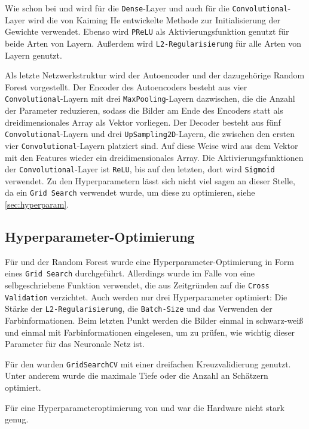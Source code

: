 Wie schon bei \PreDog{} und \PreBig{} wird für die \texttt{Dense}-Layer und auch
für die \texttt{Convolutional}-Layer wird die von Kaiming He entwickelte Methode
zur Initialisierung der Gewichte verwendet. Ebenso wird \texttt{PReLU} als
Aktivierungsfunktion genutzt für beide Arten von Layern. Außerdem wird
\texttt{L2-Regularisierung} für alle Arten von Layern genutzt.

Als letzte Netzwerkstruktur wird der Autoencoder und der dazugehörige Random
Forest vorgestellt. Der Encoder des Autoencoders besteht aus vier
\texttt{Convolutional}-Layern mit drei \texttt{MaxPooling}-Layern dazwischen,
die die Anzahl der Parameter reduzieren, sodass die Bilder am Ende des Encoders
statt als dreidimensionales Array als Vektor vorliegen. Der Decoder besteht aus
fünf \texttt{Convolutional}-Layern und drei \texttt{UpSampling2D}-Layern, die
zwischen den ersten vier \texttt{Convolutional}-Layern platziert sind. Auf diese
Weise wird aus dem Vektor mit den Features wieder ein dreidimensionales Array.
Die Aktivierungsfunktionen der \texttt{Convolutional}-Layer ist \texttt{ReLU},
bis auf den letzten, dort wird \texttt{Sigmoid} verwendet. Zu den
Hyperparametern lässt sich nicht viel sagen an dieser Stelle, da ein
\texttt{Grid Search} verwendet wurde, um diese zu optimieren, siehe
\autoref{sec:hyperparam}.

\subsection{Hyperparameter-Optimierung}
\label{sec:hyperparam}
Für \MiniDog{} und der Random Forest wurde eine Hyperparameter-Optimierung in Form
eines \texttt{Grid Search} durchgeführt. Allerdings wurde im Falle von \MiniDog{}
eine selbgeschriebene Funktion verwendet, die aus Zeitgründen auf die
\texttt{Cross Validation} verzichtet. Auch werden nur drei Hyperparameter
optimiert: Die Stärke der \texttt{L2-Re\-gu\-la\-ri\-sier\-ung}, die
\texttt{Batch-Size} und das Verwenden der Farbinformationen. Beim letzten Punkt
werden die Bilder einmal in schwarz-weiß und einmal mit Farbinformationen
eingelesen, um zu prüfen, wie wichtig dieser Parameter für das Neuronale Netz
ist.

Für den \RF{} wurden \texttt{GridSearchCV} mit einer dreifachen Kreuzvalidierung genutzt.
Unter anderem wurde die maximale Tiefe oder die Anzahl an Schätzern optimiert.


Für eine Hyperparameteroptimierung von \PreBig{} und \PreDog{} war die Hardware nicht stark genug.
